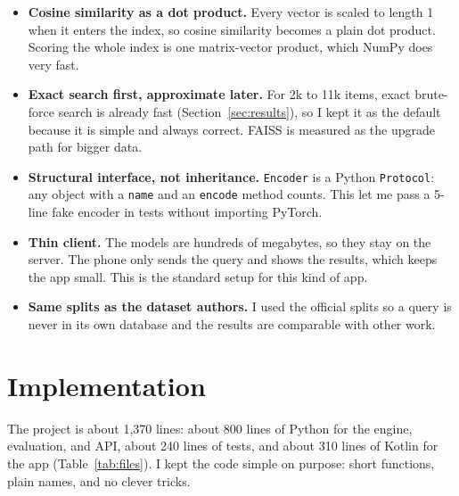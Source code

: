 \documentclass{article}
\begin{document}
\begin{itemize}
  \item \textbf{Cosine similarity as a dot product.} Every vector is scaled to length 1 when it enters the index, so cosine similarity becomes a plain dot product. Scoring the whole index is one matrix-vector product, which NumPy does very fast.
  \item \textbf{Exact search first, approximate later.} For 2k to 11k items, exact brute-force search is already fast (Section~\ref{sec:results}), so I kept it as the default because it is simple and always correct. FAISS is measured as the upgrade path for bigger data.
  \item \textbf{Structural interface, not inheritance.} \texttt{Encoder} is a Python \texttt{Protocol}: any object with a \texttt{name} and an \texttt{encode} method counts. This let me pass a 5-line fake encoder in tests without importing PyTorch.
  \item \textbf{Thin client.} The models are hundreds of megabytes, so they stay on the server. The phone only sends the query and shows the results, which keeps the app small. This is the standard setup for this kind of app.
  \item \textbf{Same splits as the dataset authors.} I used the official splits so a query is never in its own database and the results are comparable with other work.
\end{itemize}

\section{Implementation}

The project is about 1,370 lines: about 800 lines of Python for the engine, evaluation, and API, about 240 lines of tests, and about 310 lines of Kotlin for the app (Table~\ref{tab:files}). I kept the code simple on purpose: short functions, plain names, and no clever tricks.
\end{document}
